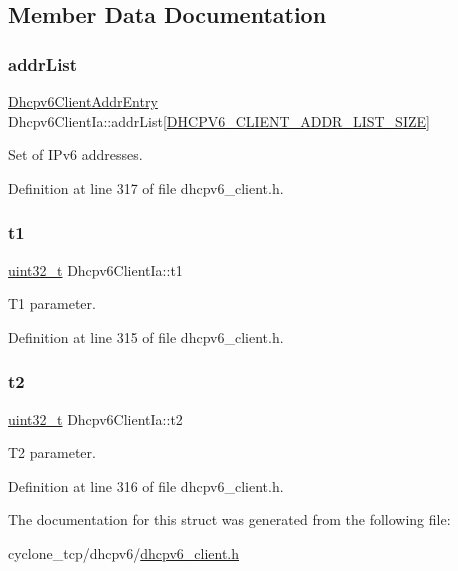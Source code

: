 \subsection{Member Data Documentation}
\mbox{\label{structDhcpv6ClientIa_a08066618ff72f24acec5dfa47449b63e}} 
\subsubsection{\texorpdfstring{addr\+List}{addrList}}
{\footnotesize\ttfamily \hyperlink{structDhcpv6ClientAddrEntry}{Dhcpv6\+Client\+Addr\+Entry} Dhcpv6\+Client\+Ia\+::addr\+List\mbox{[}\hyperlink{dhcpv6__client_8h_a50daf16fa24e452127eef9a801d8f576}{D\+H\+C\+P\+V6\+\_\+\+C\+L\+I\+E\+N\+T\+\_\+\+A\+D\+D\+R\+\_\+\+L\+I\+S\+T\+\_\+\+S\+I\+ZE}\mbox{]}}



Set of I\+Pv6 addresses. 



Definition at line 317 of file dhcpv6\+\_\+client.\+h.

\mbox{\label{structDhcpv6ClientIa_a78ed99f2943499e065563dd35dd6c926}} 
\subsubsection{\texorpdfstring{t1}{t1}}
{\footnotesize\ttfamily \hyperlink{stdint_8h_a435d1572bf3f880d55459d9805097f62}{uint32\+\_\+t} Dhcpv6\+Client\+Ia\+::t1}



T1 parameter. 



Definition at line 315 of file dhcpv6\+\_\+client.\+h.

\mbox{\label{structDhcpv6ClientIa_ad93ce83f13052385ac51475baa097cf1}} 
\subsubsection{\texorpdfstring{t2}{t2}}
{\footnotesize\ttfamily \hyperlink{stdint_8h_a435d1572bf3f880d55459d9805097f62}{uint32\+\_\+t} Dhcpv6\+Client\+Ia\+::t2}



T2 parameter. 



Definition at line 316 of file dhcpv6\+\_\+client.\+h.



The documentation for this struct was generated from the following file\+:\begin{DoxyCompactItemize}
\item 
cyclone\+\_\+tcp/dhcpv6/\hyperlink{dhcpv6__client_8h}{dhcpv6\+\_\+client.\+h}\end{DoxyCompactItemize}
